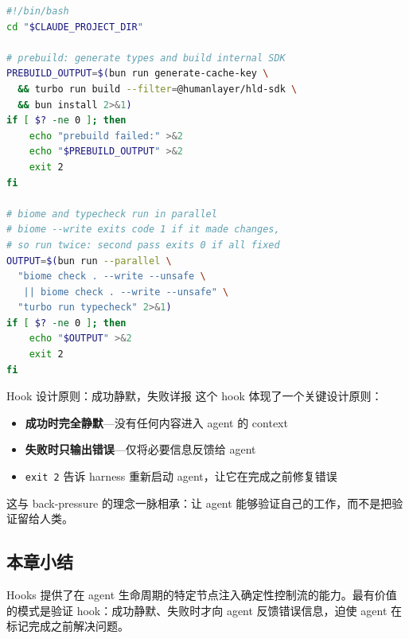\begin{lstlisting}[caption={HumanLayer 的验证 Hook（Stop Hook）},language=bash]
#!/bin/bash
cd "$CLAUDE_PROJECT_DIR"

# prebuild: generate types and build internal SDK
PREBUILD_OUTPUT=$(bun run generate-cache-key \
  && turbo run build --filter=@humanlayer/hld-sdk \
  && bun install 2>&1)
if [ $? -ne 0 ]; then
    echo "prebuild failed:" >&2
    echo "$PREBUILD_OUTPUT" >&2
    exit 2
fi

# biome and typecheck run in parallel
# biome --write exits code 1 if it made changes,
# so run twice: second pass exits 0 if all fixed
OUTPUT=$(bun run --parallel \
  "biome check . --write --unsafe \
   || biome check . --write --unsafe" \
  "turbo run typecheck" 2>&1)
if [ $? -ne 0 ]; then
    echo "$OUTPUT" >&2
    exit 2
fi
\end{lstlisting}

\begin{importantbox}{Hook 设计原则：成功静默，失败详报}
这个 hook 体现了一个关键设计原则：
\begin{itemize}[leftmargin=1.5em]
    \item \textbf{成功时完全静默}---没有任何内容进入 agent 的 context
    \item \textbf{失败时只输出错误}---仅将必要信息反馈给 agent
    \item \texttt{exit 2} 告诉 harness 重新启动 agent，让它在完成之前修复错误
\end{itemize}
这与 back-pressure 的理念一脉相承：让 agent 能够验证自己的工作，而不是把验证留给人类。
\end{importantbox}

\subsection{本章小结}

Hooks 提供了在 agent 生命周期的特定节点注入确定性控制流的能力。最有价值的模式是验证 hook：成功静默、失败时才向 agent 反馈错误信息，迫使 agent 在标记完成之前解决问题。


